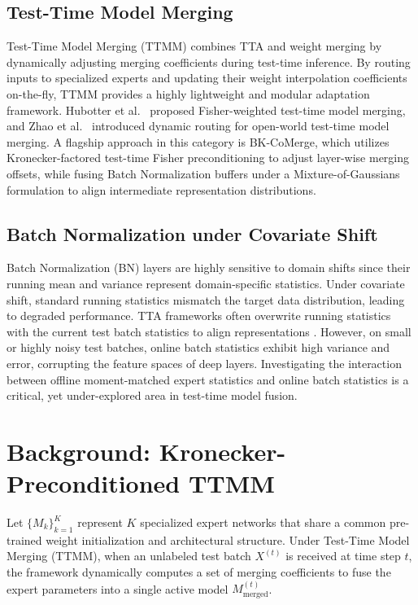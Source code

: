 \documentclass{article}
\theoremstyle{plain}
\theoremstyle{definition}
\theoremstyle{remark}
\begin{document}
\subsection{Test-Time Model Merging}
Test-Time Model Merging (TTMM) combines TTA and weight merging by dynamically adjusting merging coefficients during test-time inference. By routing inputs to specialized experts and updating their weight interpolation coefficients on-the-fly, TTMM provides a highly lightweight and modular adaptation framework. Hubotter et al.\ \cite{hubotter2025fisher} proposed Fisher-weighted test-time model merging, and Zhao et al.\ \cite{zhao2024dynamic} introduced dynamic routing for open-world test-time model merging. A flagship approach in this category is BK-CoMerge, which utilizes Kronecker-factored test-time Fisher preconditioning to adjust layer-wise merging offsets, while fusing Batch Normalization buffers under a Mixture-of-Gaussians formulation to align intermediate representation distributions.

\subsection{Batch Normalization under Covariate Shift}
Batch Normalization (BN) layers are highly sensitive to domain shifts since their running mean and variance represent domain-specific statistics. Under covariate shift, standard running statistics mismatch the target data distribution, leading to degraded performance. TTA frameworks often overwrite running statistics with the current test batch statistics to align representations \cite{wang2021tent}. However, on small or highly noisy test batches, online batch statistics exhibit high variance and error, corrupting the feature spaces of deep layers. Investigating the interaction between offline moment-matched expert statistics and online batch statistics is a critical, yet under-explored area in test-time model fusion.

\section{Background: Kronecker-Preconditioned TTMM}
\label{sec:background}
Let $\{M_k\}_{k=1}^K$ represent $K$ specialized expert networks that share a common pre-trained weight initialization and architectural structure. Under Test-Time Model Merging (TTMM), when an unlabeled test batch $X^{(t)}$ is received at time step $t$, the framework dynamically computes a set of merging coefficients to fuse the expert parameters into a single active model $M_{\text{merged}}^{(t)}$.
\end{document}
